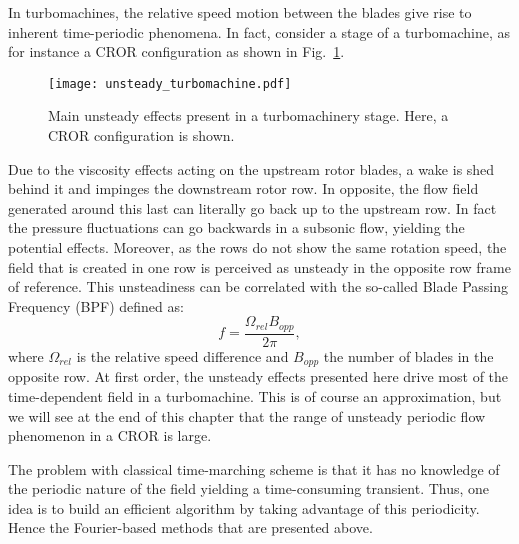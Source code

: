 In turbomachines, the relative speed motion between the blades
give rise to inherent time-periodic phenomena.
In fact, consider a stage of a turbomachine, as for instance
a CROR configuration as shown 
in Fig.~\ref{fig:sm_unsteady_turbomachine}. 
\begin{figure}[htbp]
  \centering
  \texttt{[image: unsteady\_turbomachine.pdf]}
  \caption{Main unsteady effects present in a turbomachinery stage. Here, a CROR
  configuration is shown.}
  \label{fig:sm_unsteady_turbomachine}
\end{figure}
Due to the
viscosity effects acting on the upstream rotor blades, 
a wake is shed behind it and 
impinges the downstream rotor row. 
In opposite, the flow field
generated around this last can literally go back up
to the upstream row. In fact
the pressure fluctuations can go backwards in a subsonic flow, yielding
the potential effects. Moreover, as the rows do not 
show the same rotation speed,
the field that is created in one row is perceived as unsteady in the opposite 
row frame of reference. This unsteadiness can be
correlated with the so-called Blade Passing Frequency (BPF) defined as:
\begin{equation}
	f = \frac{\Omega_{rel} B_{opp}}{2 \pi},
\end{equation}
where $\Omega_{rel}$ is the relative speed difference 
and $B_{opp}$ the number of blades in the opposite row.
At first order, the unsteady effects presented here drive
most of the time-dependent field in a turbomachine. This 
is of course an approximation, but we will see at the end
of this chapter that the range of unsteady periodic
flow phenomenon in a CROR is large.

The problem with classical time-marching scheme is 
that it has no knowledge
of the periodic nature of the field yielding a time-consuming
transient. Thus, one idea is to build an efficient algorithm
by taking advantage of this periodicity. 
Hence the Fourier-based methods that are
presented above.

